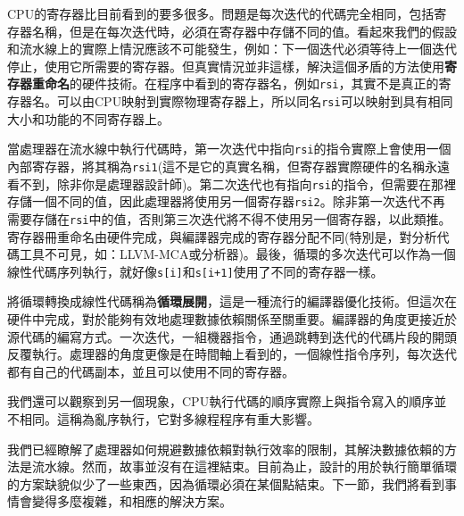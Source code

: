 CPU的寄存器比目前看到的要多很多。問題是每次迭代的代碼完全相同，包括寄存器名稱，但是在每次迭代時，必須在寄存器中存儲不同的值。看起來我們的假設和流水線上的實際上情況應該不可能發生，例如：下一個迭代必須等待上一個迭代停止，使用它所需要的寄存器。但真實情況並非這樣，解決這個矛盾的方法使用\textbf{寄存器重命名}的硬件技術。在程序中看到的寄存器名，例如\texttt{rsi}，其實不是真正的寄存器名。可以由CPU映射到實際物理寄存器上，所以同名\texttt{rsi}可以映射到具有相同大小和功能的不同寄存器上。

當處理器在流水線中執行代碼時，第一次迭代中指向\texttt{rsi}的指令實際上會使用一個內部寄存器，將其稱為\texttt{rsi1}(這不是它的真實名稱，但寄存器實際硬件的名稱永遠看不到，除非你是處理器設計師)。第二次迭代也有指向\texttt{rsi}的指令，但需要在那裡存儲一個不同的值，因此處理器將使用另一個寄存器\texttt{rsi2}。除非第一次迭代不再需要存儲在\texttt{rsi}中的值，否則第三次迭代將不得不使用另一個寄存器，以此類推。寄存器冊重命名由硬件完成，與編譯器完成的寄存器分配不同(特別是，對分析代碼工具不可見，如：LLVM-MCA或分析器)。最後，循環的多次迭代可以作為一個線性代碼序列執行，就好像\texttt{s[i]}和\texttt{s[i+1]}使用了不同的寄存器一樣。

將循環轉換成線性代碼稱為\textbf{循環展開}，這是一種流行的編譯器優化技術。但這次在硬件中完成，對於能夠有效地處理數據依賴關係至關重要。編譯器的角度更接近於源代碼的編寫方式。一次迭代，一組機器指令，通過跳轉到迭代的代碼片段的開頭反覆執行。處理器的角度更像是在時間軸上看到的，一個線性指令序列，每次迭代都有自己的代碼副本，並且可以使用不同的寄存器。

我們還可以觀察到另一個現象，CPU執行代碼的順序實際上與指令寫入的順序並不相同。這稱為亂序執行，它對多線程程序有重大影響。

我們已經瞭解了處理器如何規避數據依賴對執行效率的限制，其解決數據依賴的方法是流水線。然而，故事並沒有在這裡結束。目前為止，設計的用於執行簡單循環的方案缺貌似少了一些東西，因為循環必須在某個點結束。下一節，我們將看到事情會變得多麼複雜，和相應的解決方案。























